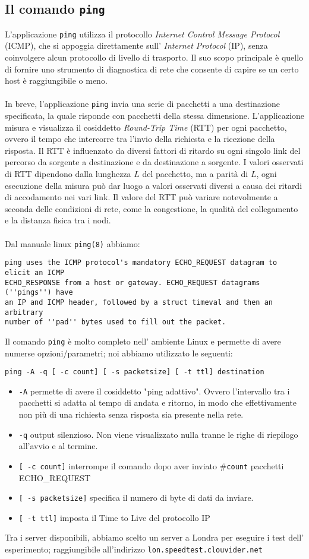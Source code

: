 \subsection{Il comando \texttt{ping}}
L'applicazione \texttt{ping} utilizza il protocollo \textit{Internet Control Message Protocol} (ICMP), che si appoggia direttamente sull' \textit{Internet Protocol} (IP), senza coinvolgere alcun protocollo di livello di trasporto. Il suo scopo principale è quello di fornire uno strumento di diagnostica di rete che consente di capire se un certo host è raggiungibile o meno.\\\\
In breve, l’applicazione \texttt{ping} invia una serie di pacchetti a una destinazione specificata, la quale risponde con pacchetti della stessa dimensione. L’applicazione misura e visualizza il cosiddetto \textit{Round-Trip Time} (RTT) per ogni pacchetto, ovvero il tempo che intercorre tra l’invio della richiesta e la ricezione della risposta.
\clearpage
\noindent Il RTT è influenzato da diversi fattori di ritardo su ogni singolo link del percorso da sorgente a destinazione e da destinazione a sorgente. I valori osservati di RTT dipendono dalla lunghezza $L$ del pacchetto, ma a parità di $L$, ogni esecuzione della misura può dar luogo a valori osservati diversi a causa dei ritardi di accodamento nei vari link. Il valore del RTT può variare notevolmente a seconda delle condizioni di rete, come la congestione, la qualità del collegamento e la distanza fisica tra i nodi.\\\\
Dal manuale linux \texttt{ping(8)} abbiamo:
\begin{verbatim}
ping uses the ICMP protocol's mandatory ECHO_REQUEST datagram to elicit an ICMP 
ECHO_RESPONSE from a host or gateway. ECHO_REQUEST datagrams (''pings'') have 
an IP and ICMP header, followed by a struct timeval and then an arbitrary 
number of ''pad'' bytes used to fill out the packet.
\end{verbatim}
Il comando \texttt{ping} è molto completo nell' ambiente Linux e permette di avere numerse opzioni/parametri; noi abbiamo utilizzato le seguenti:
\begin{verbatim}
ping -A -q [ -c count] [ -s packetsize] [ -t ttl] destination
\end{verbatim}
\begin{itemize}
    \item \texttt{-A} permette di avere il cosiddetto "ping adattivo". Ovvero l'intervallo tra i pacchetti si adatta al tempo di andata e ritorno, in modo che effettivamente non più di una richiesta senza risposta sia presente nella rete.
    \item \texttt{-q} output silenzioso. Non viene visualizzato nulla tranne le righe di riepilogo all'avvio e al termine.
    \item \texttt{[ -c count]} interrompe il comando dopo aver inviato \#\texttt{count} pacchetti ECHO\_REQUEST
    \item \texttt{[ -s packetsize]} specifica il numero di byte di dati da inviare.
    \item \texttt{[ -t ttl]} imposta il Time to Live del protocollo IP
\end{itemize}
Tra i server disponibili, abbiamo scelto un server a Londra per eseguire i test dell' esperimento; raggiungibile all'indirizzo \texttt{lon.speedtest.clouvider.net}